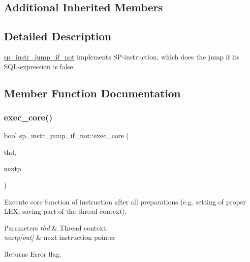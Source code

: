 \subsection*{Additional Inherited Members}


\subsection{Detailed Description}
\mbox{\hyperlink{classsp__instr__jump__if__not}{sp\+\_\+instr\+\_\+jump\+\_\+if\+\_\+not}} implements SP-\/instruction, which does the jump if its S\+QL-\/expression is false. 

\subsection{Member Function Documentation}
\mbox{\label{classsp__instr__jump__if__not_a800bbb55787b6b07c78cf8d698d308bf}} 
\subsubsection{\texorpdfstring{exec\+\_\+core()}{exec\_core()}}
{\footnotesize\ttfamily bool sp\+\_\+instr\+\_\+jump\+\_\+if\+\_\+not\+::exec\+\_\+core (\begin{DoxyParamCaption}\item[{T\+HD $\ast$}]{thd,  }\item[{uint $\ast$}]{nextp }\end{DoxyParamCaption})\hspace{0.3cm}{\ttfamily [virtual]}}

Execute core function of instruction after all preparations (e.\+g. setting of proper L\+EX, saving part of the thread context).


\begin{DoxyParams}{Parameters}
{\em thd} & Thread context. \\
\hline
{\em nextp\mbox{[}out\mbox{]}} & next instruction pointer\\
\hline
\end{DoxyParams}
\begin{DoxyReturn}{Returns}
Error flag. 
\end{DoxyReturn}


